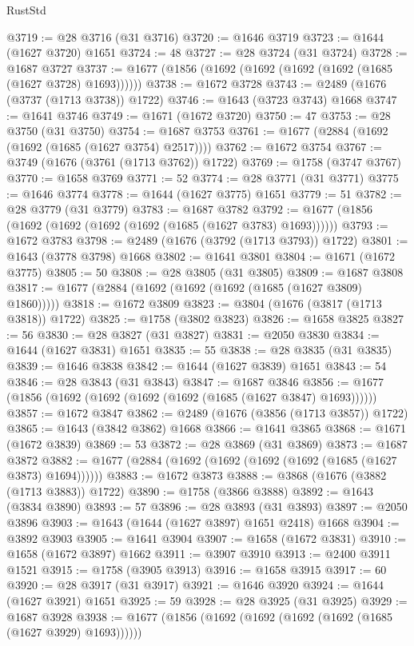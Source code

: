 \begin{lexlean}{RustStd}
\begin{coremodule}
@3719 := @28 @3716 (@31 @3716)
@3720 := @1646 @3719
@3723 := @1644 (@1627 @3720) @1651
@3724 := 48
@3727 := @28 @3724 (@31 @3724)
@3728 := @1687 @3727
@3737 := @1677 (@1856 (@1692 (@1692 (@1692 (@1692 (@1685 (@1627 @3728) @1693))))))
@3738 := @1672 @3728
@3743 := @2489 (@1676 (@3737 (@1713 @3738)) @1722)
@3746 := @1643 (@3723 @3743) @1668
@3747 := @1641 @3746
@3749 := @1671 (@1672 @3720)
@3750 := 47
@3753 := @28 @3750 (@31 @3750)
@3754 := @1687 @3753
@3761 := @1677 (@2884 (@1692 (@1692 (@1685 (@1627 @3754) @2517))))
@3762 := @1672 @3754
@3767 := @3749 (@1676 (@3761 (@1713 @3762)) @1722)
@3769 := @1758 (@3747 @3767)
@3770 := @1658 @3769
@3771 := 52
@3774 := @28 @3771 (@31 @3771)
@3775 := @1646 @3774
@3778 := @1644 (@1627 @3775) @1651
@3779 := 51
@3782 := @28 @3779 (@31 @3779)
@3783 := @1687 @3782
@3792 := @1677 (@1856 (@1692 (@1692 (@1692 (@1692 (@1685 (@1627 @3783) @1693))))))
@3793 := @1672 @3783
@3798 := @2489 (@1676 (@3792 (@1713 @3793)) @1722)
@3801 := @1643 (@3778 @3798) @1668
@3802 := @1641 @3801
@3804 := @1671 (@1672 @3775)
@3805 := 50
@3808 := @28 @3805 (@31 @3805)
@3809 := @1687 @3808
@3817 := @1677 (@2884 (@1692 (@1692 (@1692 (@1685 (@1627 @3809) @1860)))))
@3818 := @1672 @3809
@3823 := @3804 (@1676 (@3817 (@1713 @3818)) @1722)
@3825 := @1758 (@3802 @3823)
@3826 := @1658 @3825
@3827 := 56
@3830 := @28 @3827 (@31 @3827)
@3831 := @2050 @3830
@3834 := @1644 (@1627 @3831) @1651
@3835 := 55
@3838 := @28 @3835 (@31 @3835)
@3839 := @1646 @3838
@3842 := @1644 (@1627 @3839) @1651
@3843 := 54
@3846 := @28 @3843 (@31 @3843)
@3847 := @1687 @3846
@3856 := @1677 (@1856 (@1692 (@1692 (@1692 (@1692 (@1685 (@1627 @3847) @1693))))))
@3857 := @1672 @3847
@3862 := @2489 (@1676 (@3856 (@1713 @3857)) @1722)
@3865 := @1643 (@3842 @3862) @1668
@3866 := @1641 @3865
@3868 := @1671 (@1672 @3839)
@3869 := 53
@3872 := @28 @3869 (@31 @3869)
@3873 := @1687 @3872
@3882 := @1677 (@2884 (@1692 (@1692 (@1692 (@1692 (@1685 (@1627 @3873) @1694))))))
@3883 := @1672 @3873
@3888 := @3868 (@1676 (@3882 (@1713 @3883)) @1722)
@3890 := @1758 (@3866 @3888)
@3892 := @1643 (@3834 @3890)
@3893 := 57
@3896 := @28 @3893 (@31 @3893)
@3897 := @2050 @3896
@3903 := @1643 (@1644 (@1627 @3897) @1651 @2418) @1668
@3904 := @3892 @3903
@3905 := @1641 @3904
@3907 := @1658 (@1672 @3831)
@3910 := @1658 (@1672 @3897) @1662
@3911 := @3907 @3910
@3913 := @2400 @3911 @1521
@3915 := @1758 (@3905 @3913)
@3916 := @1658 @3915
@3917 := 60
@3920 := @28 @3917 (@31 @3917)
@3921 := @1646 @3920
@3924 := @1644 (@1627 @3921) @1651
@3925 := 59
@3928 := @28 @3925 (@31 @3925)
@3929 := @1687 @3928
@3938 := @1677 (@1856 (@1692 (@1692 (@1692 (@1692 (@1685 (@1627 @3929) @1693))))))

\end{coremodule}
\end{lexlean}
